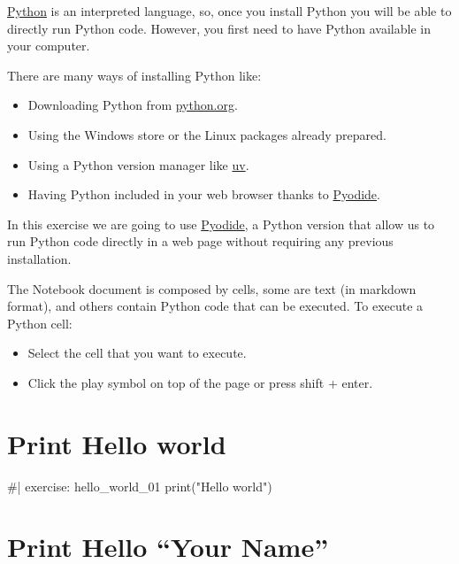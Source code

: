 \documentclass[
  letterpaper,
  DIV=11,
  numbers=noendperiod]{scrreprt}
\newenvironment{Shaded}{\begin{snugshade}}{\end{snugshade}}
\newcommand{\NormalTok}[1]{\textcolor[rgb]{0.00,0.23,0.31}{#1}}
\providecommand{\tightlist}{%
  \setlength{\itemsep}{0pt}\setlength{\parskip}{0pt}}\usepackage{longtable,booktabs,array}
\theoremstyle{remark}
\begin{document}
\href{https://en.wikipedia.org/wiki/Python_(programming_language)}{Python}
is an interpreted language, so, once you install Python you will be able
to directly run Python code. However, you first need to have Python
available in your computer.

There are many ways of installing Python like:

\begin{itemize}
\tightlist
\item
  Downloading Python from \href{https://www.python.org/}{python.org}.
\item
  Using the Windows store or the Linux packages already prepared.
\item
  Using a Python version manager like
  \href{https://docs.astral.sh/uv/}{uv}.
\item
  Having Python included in your web browser thanks to
  \href{https://pyodide.org/}{Pyodide}.
\end{itemize}

In this exercise we are going to use
\href{https://pyodide.org/}{Pyodide}, a Python version that allow us to
run Python code directly in a web page without requiring any previous
installation.

The Notebook document is composed by cells, some are text (in markdown
format), and others contain Python code that can be executed. To execute
a Python cell:

\begin{itemize}
\tightlist
\item
  Select the cell that you want to execute.
\item
  Click the play symbol on top of the page or press shift + enter.
\end{itemize}

\section{Print Hello world}\label{print-hello-world}

\begin{Shaded}
\begin{Highlighting}[]
\NormalTok{\#| exercise: hello\_world\_01}
\NormalTok{print("Hello world")}
\end{Highlighting}
\end{Shaded}

\section{Print Hello ``Your Name''}\label{print-hello-your-name}
\end{document}
